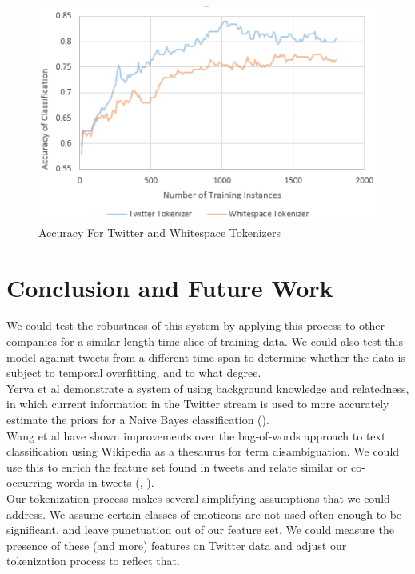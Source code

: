 \documentclass[letterpaper]{article}
\begin{document}
\begin{figure}[ht]
\centering
\includegraphics[width=\linewidth]{chart_twitterVSwhitespace_detailed}
\caption{Accuracy For Twitter and Whitespace Tokenizers}
\label{fig:chart_twitterwhitespace_detailed}
\end{figure}


\section{Conclusion and Future Work}

We could test the robustness of this system by applying this process to other companies for a similar-length time slice of training data. We could also test this model against tweets from a different time span to determine whether the data is subject to temporal overfitting, and to what degree.\\

Yerva et al demonstrate a system of using background knowledge and relatedness, in which current information in the Twitter stream is used to more accurately estimate the priors for a Naive Bayes classification (\citeauthor{journals/ijcsa/YervaMA12}).\\

Wang et al have shown improvements over the bag-of-words approach to text classification using Wikipedia as a thesaurus for term disambiguation. We could use this to enrich the feature set found in tweets and relate similar or co-occurring words in tweets (\citeauthor{Wang:2008:UWC:1510528.1511383}, \citeauthor{Wang:2009:UWK:1554488.1554492}).\\

Our tokenization process makes several simplifying assumptions that we could address. We assume certain classes of emoticons are not used often enough to be significant, and leave punctuation out of our feature set. We could measure the presence of these (and more) features on Twitter data and adjust our tokenization process to reflect that.\\
\end{document}

